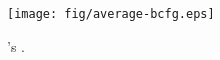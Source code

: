 
\begin{figure}[!ht]
\begin{center}
\texttt{[image: fig/average-bcfg.eps]}
\caption{'s \BG.}\label{fig-average-bcfg}
\end{center}
\end{figure}
